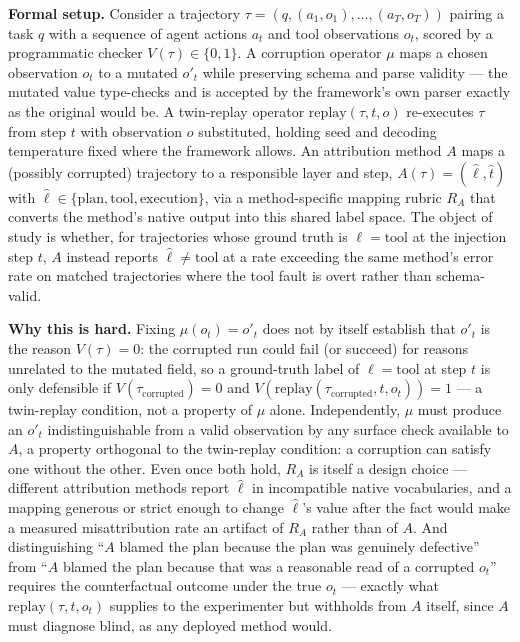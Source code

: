 \documentclass[11pt]{article}
\begin{document}
\noindent\textbf{Formal setup.} Consider a trajectory $\tau = (q, (a_1,o_1), \dots, (a_T,o_T))$ pairing a task $q$ with a sequence of agent actions $a_t$ and tool observations $o_t$, scored by a programmatic checker $V(\tau) \in \{0,1\}$. A corruption operator $\mu$ maps a chosen observation $o_t$ to a mutated $o'_t$ while preserving schema and parse validity --- the mutated value type-checks and is accepted by the framework's own parser exactly as the original would be. A twin-replay operator $\mathrm{replay}(\tau, t, o)$ re-executes $\tau$ from step $t$ with observation $o$ substituted, holding seed and decoding temperature fixed where the framework allows. An attribution method $A$ maps a (possibly corrupted) trajectory to a responsible layer and step, $A(\tau) = (\hat{\ell}, \hat{t})$ with $\hat{\ell} \in \{\text{plan}, \text{tool}, \text{execution}\}$, via a method-specific mapping rubric $R_A$ that converts the method's native output into this shared label space. The object of study is whether, for trajectories whose ground truth is $\ell = \text{tool}$ at the injection step $t$, $A$ instead reports $\hat{\ell} \neq \text{tool}$ at a rate exceeding the same method's error rate on matched trajectories where the tool fault is overt rather than schema-valid.

\noindent\textbf{Why this is hard.} Fixing $\mu(o_t) = o'_t$ does not by itself establish that $o'_t$ is the reason $V(\tau) = 0$: the corrupted run could fail (or succeed) for reasons unrelated to the mutated field, so a ground-truth label of $\ell = \text{tool}$ at step $t$ is only defensible if $V(\tau_{\text{corrupted}}) = 0$ and $V(\mathrm{replay}(\tau_{\text{corrupted}}, t, o_t)) = 1$ --- a twin-replay condition, not a property of $\mu$ alone. Independently, $\mu$ must produce an $o'_t$ indistinguishable from a valid observation by any surface check available to $A$, a property orthogonal to the twin-replay condition: a corruption can satisfy one without the other. Even once both hold, $R_A$ is itself a design choice --- different attribution methods report $\hat{\ell}$ in incompatible native vocabularies, and a mapping generous or strict enough to change $\hat{\ell}$'s value after the fact would make a measured misattribution rate an artifact of $R_A$ rather than of $A$. And distinguishing ``$A$ blamed the plan because the plan was genuinely defective'' from ``$A$ blamed the plan because that was a reasonable read of a corrupted $o_t$'' requires the counterfactual outcome under the true $o_t$ --- exactly what $\mathrm{replay}(\tau, t, o_t)$ supplies to the experimenter but withholds from $A$ itself, since $A$ must diagnose blind, as any deployed method would.
\end{document}
